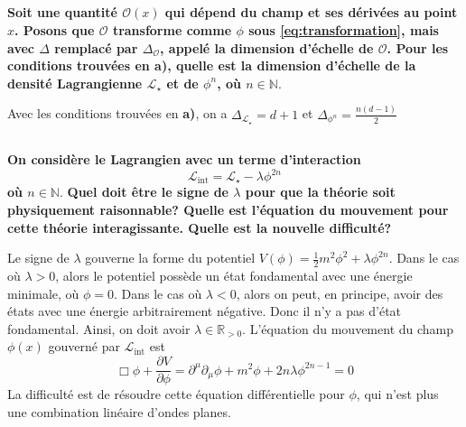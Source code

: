 \documentclass{article}
\numberwithin{equation}{section}
\theoremstyle{solution}
\begin{document}
\subsection{}
\textbf{Soit une quantité $\mathcal{O}(x)$ qui dépend du champ et ses dérivées au point $x$. Posons que $\mathcal{O}$ 
transforme comme $\phi$ sous \eqref{eq:transformation}, mais avec $\Delta$ remplacé par $\Delta_\mathcal{O}$, appelé la dimension d’échelle
de $\mathcal{O}$. Pour les conditions trouvées en a), quelle est la dimension d’échelle de la densité
Lagrangienne $\mathcal{L}_{\star}$ et de $\phi^{n}$, où $n \in \mathbb{N}$}.
\vspace{2ex}

Avec les conditions trouvées en \textbf{a)}, on a $\boxed{\Delta_{\mathcal{L}_\star} = d+1}$ et $\boxed{\Delta_{\phi^{n}} = \frac{n(d-1)}{2}}$

\subsection{}
\textbf{On considère le Lagrangien avec un terme d'interaction}
\begin{equation}\label{eq:Lagrangien2c}
       \mathcal{L}_{\mathrm{int}} = \mathcal{L}_{\star} - \lambda \phi^{2n} 
\end{equation} 
\textbf{où $n \in \mathbb{N}$}.
\textbf{Quel doit être le signe de $\lambda$ pour que la théorie soit physiquement 
raisonnable? Quelle est l’équation du mouvement pour cette théorie interagissante. Quelle est la nouvelle difficulté?}

\vspace{2ex}

Le signe de $\lambda $ gouverne la forme du potentiel $V(\phi) = \frac{1}{2}m^{2}\phi^{2} + \lambda \phi^{2n}$. 
Dans le cas où $\lambda > 0$, alors le potentiel possède un état fondamental avec une énergie minimale, où $\phi = 0$. 
Dans le cas où $\lambda < 0$, alors on peut, en principe, avoir des états avec une énergie arbitrairement négative.
Donc il n'y a pas d'état fondamental. Ainsi, on doit avoir $\lambda \in \mathbb{R}_{>0}$.
L'équation du mouvement du champ $\phi(x)$ gouverné par $\mathcal{L}_{\mathrm{int}}$ est
\begin{equation}
        \boxed{\Box\phi + \frac{\partial V}{\partial \phi} = \partial^\mu \partial_{\mu} \phi + m^2\phi + 2n\lambda \phi^{2n-1} = 0}
\end{equation} 
La difficulté est de résoudre cette équation différentielle pour $\phi$, qui n'est plus une combination linéaire d'ondes planes. 
\end{document}
